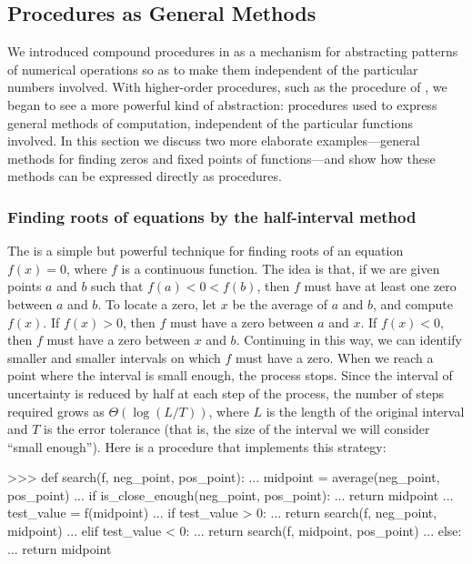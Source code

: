 \subsection{Procedures as General Methods}
\label{Section 1.3.3}

We introduced compound procedures in  as a mechanism for
abstracting patterns of numerical operations so as to make them independent of
the particular numbers involved.  With higher-order procedures, such as the
 procedure of , we began to see a more
powerful kind of abstraction: procedures used to express general methods of
computation, independent of the particular functions involved.  In this section
we discuss two more elaborate examples---general methods for finding zeros and
fixed points of functions---and show how these methods can be expressed
directly as procedures.

\subsubsection*{Finding roots of equations by the half-interval method}

The  is a simple but powerful technique for
finding roots of an equation \( f(x) = 0 \), where \( f \) is a continuous
function.  The idea is that, if we are given points \( a \) and \( b \) such that
\( f(a) < 0 < f(b) \), then \( f \) must have at least one zero between
\( a \) and \( b \).  To locate a zero, let \( x \) be the average of \( a \) and \( b \),
and compute \( f(x) \).  If \( f(x) > 0 \), then \( f \) must have a zero
between \( a \) and \( x \).  If \( f(x) < 0 \), then \( f \) must have a zero
between \( x \) and \( b \).  Continuing in this way, we can identify smaller and
smaller intervals on which \( f \) must have a zero.  When we reach a point where
the interval is small enough, the process stops.  Since the interval of
uncertainty is reduced by half at each step of the process, the number of steps
required grows as \( \Theta(\log(L / T)) \), where \( L \) is the
length of the original interval and \( T \) is the error tolerance (that is, the
size of the interval we will consider ``small enough'').  Here is a procedure
that implements this strategy:

\begin{codeBlock}
>>> def search(f, neg_point, pos_point):
...     midpoint = average(neg_point, pos_point)
...     if is_close_enough(neg_point, pos_point):
...         return midpoint
...     test_value = f(midpoint)
...     if test_value > 0:
...         return search(f, neg_point, midpoint)
...     elif test_value < 0:
...         return search(f, midpoint, pos_point)
...     else:
...         return midpoint
\end{codeBlock}

